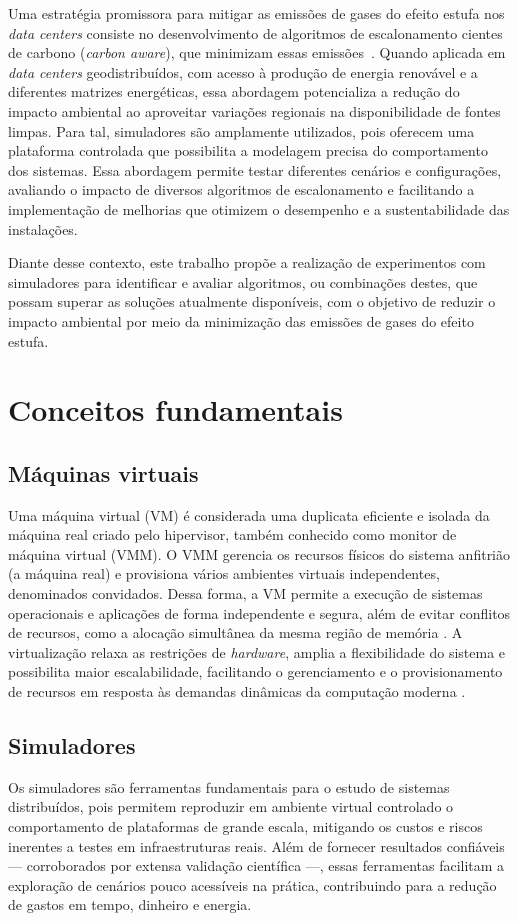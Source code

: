 \documentclass[12pt]{article}
\begin{document}
Uma estratégia promissora para mitigar as emissões de gases do efeito estufa nos \textit{data centers} consiste no desenvolvimento de algoritmos de escalonamento cientes de carbono (\textit{carbon aware}), que minimizam essas emissões~\cite{vasconcelos2023optimal}. Quando aplicada em \textit{data centers} geodistribuídos, com acesso à produção de energia renovável e a diferentes matrizes energéticas, essa abordagem potencializa a redução do impacto ambiental ao aproveitar variações regionais na disponibilidade de fontes limpas. Para tal, simuladores são amplamente utilizados, pois oferecem uma plataforma controlada que possibilita a modelagem precisa do comportamento dos sistemas. Essa abordagem permite testar diferentes cenários e configurações, avaliando o impacto de diversos algoritmos de escalonamento e facilitando a implementação de melhorias que otimizem o desempenho e a sustentabilidade das instalações.

Diante desse contexto, este trabalho propõe a realização de experimentos com simuladores para identificar e avaliar algoritmos, ou combinações destes, que possam superar as soluções atualmente disponíveis, com o objetivo de reduzir o impacto ambiental por meio da minimização das emissões de gases do efeito estufa.

\section{Conceitos fundamentais}
\subsection{Máquinas virtuais}
Uma máquina virtual (VM) é considerada uma duplicata eficiente e isolada da máquina real criado pelo hipervisor, também conhecido como monitor de máquina virtual (VMM). O VMM gerencia os recursos físicos do sistema anfitrião (a máquina real) e provisiona vários ambientes virtuais independentes, denominados convidados. Dessa forma, a VM permite a execução de sistemas operacionais e aplicações de forma independente e segura, além de evitar conflitos de recursos, como a alocação simultânea da mesma região de memória \cite{popek:74}. A virtualização relaxa as restrições de \textit{hardware}, amplia a flexibilidade do sistema e possibilita maior escalabilidade, facilitando o gerenciamento e o provisionamento de recursos em resposta às demandas dinâmicas da computação moderna \cite{buyya:13}.

\subsection{Simuladores}
Os simuladores são ferramentas fundamentais para o estudo de sistemas distribuídos, pois permitem reproduzir em ambiente virtual controlado o comportamento de plataformas de grande escala, mitigando os custos e riscos inerentes a testes em infraestruturas reais. Além de fornecer resultados confiáveis --- corroborados por extensa validação científica ---, essas ferramentas facilitam a exploração de cenários pouco acessíveis na prática, contribuindo para a redução de gastos em tempo, dinheiro e energia.
\end{document}
